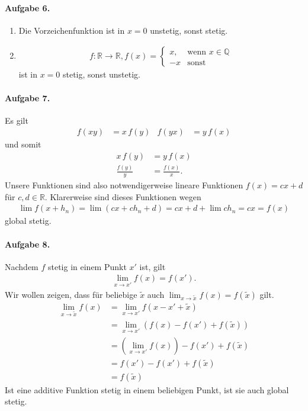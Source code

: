 \documentclass{article}
\begin{document}
\paragraph{Aufgabe 6.}
\begin{enumerate}
    \item Die Vorzeichenfunktion ist in $x = 0$ unstetig, sonst stetig.
    \item \begin{align*}
        f: \mathbb{R} \rightarrow \mathbb{R}, f(x) = \begin{cases}
            x, & \text{wenn $x \in \mathbb{Q}$} \\
            -x & \text{sonst}
        \end{cases}
    \end{align*}
    ist in $x = 0$ stetig, sonst unstetig.
\end{enumerate}

\paragraph{Aufgabe 7.}
Es gilt
\begin{align*}
    f(xy) &= x\, f(y) & f(yx) &= y\, f(x)
\end{align*}
und somit
\begin{align*}
    x\, f(y) &= y\, f(x) \\
    \frac{f(y)}{y} &= \frac{f(x)}{x}.
\end{align*}
Unsere Funktionen sind also notwendigerweise lineare Funktionen $f(x) = cx + d$ für $c, d \in \mathbb{R}$. Klarerweise sind dieses Funktionen wegen
\begin{align*}
    \lim f(x + h_n) = \lim (cx + ch_n + d) = cx + d + \lim ch_n = cx = f(x)
\end{align*}
global stetig.

\paragraph{Aufgabe 8.} Nachdem $f$ stetig in einem Punkt $x'$ ist, gilt 
\begin{align*}
    \lim_{x \to x'} f(x) = f(x').
\end{align*}
Wir wollen zeigen, dass für beliebige $\tilde{x}$ auch $\lim_{x \to \tilde{x}}f(x) = f(\tilde{x})$ gilt.
\begin{align*}
    \lim_{x \to \tilde{x}} f(x) &= \lim_{x \to x'} f(x - x' + \tilde{x}) \\
    &= \lim_{x \to x'} (f(x) - f(x') + f(\tilde{x})) \\
    &= (\lim_{x \to x'}f(x)) - f(x') + f(\tilde{x}) \\
    &= f(x') - f(x') + f(\tilde{x}) \\
    &= f(\tilde{x})
\end{align*}
Ist eine additive Funktion stetig in einem beliebigen Punkt, ist sie auch global stetig.
\end{document}
